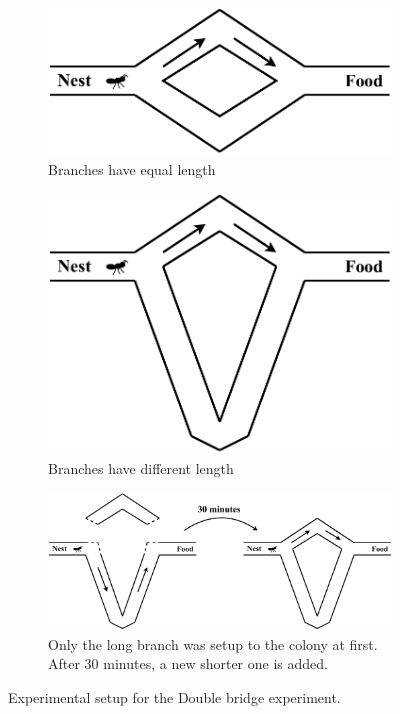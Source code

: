 \setlength{\intextsep}{4pt}
\renewcommand{\scalefigure}{0.5}
\begin{figure}[htbp]
	\centering
	\begin{subfigure}{.49\linewidth}
		\centering
		\includegraphics[scale=\scalefigure]{Figures/chap 1/Ant Experiment.pdf}
		\caption{Branches have equal length}
		\label{fig:aco_exp_1}
	\end{subfigure}
	\begin{subfigure}{.49\linewidth}
		\centering
		\includegraphics[scale=\scalefigure]{Figures/chap 1/Ant Experiment 2.pdf}
		\caption{Branches have different length}
		\label{fig:aco_exp_2}
	\end{subfigure}

	\begin{subfigure}{.95\linewidth}
		\centering
		\includegraphics[scale=\scalefigure]{Figures/chap 1/Ant Experiment 3.pdf}
		\caption{Only the long branch was setup to the colony at first. After 30 minutes, a new shorter one is added.}
		\label{fig:aco_exp_3}
	\end{subfigure}
	\caption{Experimental setup for the Double bridge experiment.}
	\label{fig:aco_exp}
\end{figure}

